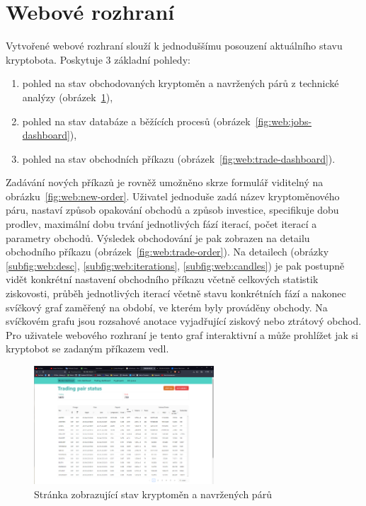\section{Webové rozhraní}
Vytvořené webové rozhraní slouží k jednoduššímu posouzení aktuálního stavu kryptobota. Poskytuje 3 základní pohledy:
\begin{enumerate}
    \item pohled na stav obchodovaných kryptoměn a navržených párů z technické analýzy (obrázek~\ref{fig:web:market-dashboard}),
    \item pohled na stav databáze a běžících procesů (obrázek~\ref{fig:web:jobs-dashboard}),
    \item pohled na stav obchodních příkazu (obrázek~\ref{fig:web:trade-dashboard}).
\end{enumerate}
Zadávání nových příkazů je rovněž umožněno skrze formulář viditelný na obrázku~\ref{fig:web:new-order}. Uživatel jednoduše zadá název kryptoměnového páru, nastaví způsob opakování obchodů a způsob investice,
specifikuje dobu prodlev, maximální dobu trvání jednotlivých fází iterací, počet iterací a parametry obchodů. Výsledek obchodování je pak zobrazen na detailu obchodního příkazu (obrázek~\ref{fig:web:trade-order}).
Na detailech (obrázky \ref{subfig:web:desc}, \ref{subfig:web:iterations}, \ref{subfig:web:candles}) je pak postupně vidět konkrétní nastavení obchodního příkazu včetně celkových statistik ziskovosti, průběh jednotlivých
iterací včetně stavu konkrétních fází a nakonec svíčkový graf zaměřený na období, ve kterém byly prováděny obchody. Na svíčkovém grafu jsou rozsahové anotace vyjadřující ziskový nebo ztrátový obchod. Pro uživatele
webového rozhraní je tento graf interaktivní a může prohlížet jak si kryptobot se zadaným příkazem vedl.

\begin{figure}[b]
    \centering
    \includegraphics[width=0.6\textwidth]{Figures/web/market-dashboard.png}
    \caption{Stránka zobrazující stav kryptoměn a navržených párů}
    \label{fig:web:market-dashboard}
\end{figure}

